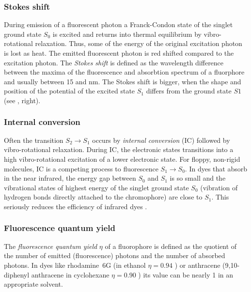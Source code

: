 \subsubsection{Stokes shift}
During emission of a fluorescent photon a Franck-Condon state of the
singlet ground state $S_0$ is excited and returns into thermal
equilibrium by vibro-rotational relaxation. Thus, some of the energy
of the original excitation photon is lost as heat. The emitted
fluorescent photon is red shifted compared to the excitation
photon. The \emph{Stokes shift} is defined as the wavelength
difference between the maxima of the fluorescence and absorbtion
spectrum of a fluorphore and usually between 15 and \unit[30]{nm}.
The Stokes shift is bigger, when the shape and position of the
potential of the excited state $S_1$ differs from the ground state
$S1$ (see , right).

\subsubsection{Internal conversion}
Often the transition $S_2\rightarrow S_1$ occurs by \emph{internal
  conversion} (IC) followed by vibro-rotational relaxation. During IC,
the electronic states transitions into a high vibro-rotational
excitation of a lower electronic state. For floppy, non-rigid
molecules, IC is a competing process to fluorescence $S_1\rightarrow
S_0$. In dyes that absorb in the near infrared, the energy gap between
$S_0$ and $S_1$ is so small and the vibrational states of highest
energy of the singlet ground state $S_0$ (vibration of hydrogen bonds
directly attached to the chromophore) are close to $S_1$. This
seriously reduces the efficiency of infrared dyes
\citep[p.~43]{Sauer2011}.


\subsubsection{Fluorescence quantum yield}
The \emph{fluorescence quantum yield} $\eta$ of a fluorophore is
defined as the quotient of the number of emitted (fluorescence)
photons and the number of absorbed photons. In dyes like rhodamine~6G
(in ethanol $\eta=0.94$ \cite{Fischer1996}) or anthracene
(9,10-diphenyl anthracene in cyclohexane $\eta=0.90$ \cite{Hamai1983})
its value can be nearly 1 in an appropriate solvent.


